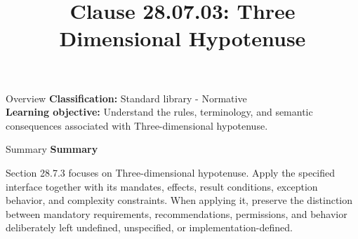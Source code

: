 \documentclass[10pt,letterpaper]{article}
\title{Clause 28.07.03: Three Dimensional Hypotenuse}
\author{}
\date{}
\begin{document}
\maketitle
\begin{CornellOverviewBox}{Overview}
\textbf{Classification:} Standard library - Normative\\[2pt]
\textbf{Learning objective:} Understand the rules, terminology, and semantic consequences associated with Three-dimensional hypotenuse.
\end{CornellOverviewBox}\begin{CornellSummaryBox}{Summary}
{\sffamily\bfseries\color{Accent} Summary}\par\vspace{3pt}Section 28.7.3 focuses on Three-dimensional hypotenuse. Apply the specified interface together with its mandates, effects, result conditions, exception behavior, and complexity constraints. When applying it, preserve the distinction between mandatory requirements, recommendations, permissions, and behavior deliberately left undefined, unspecified, or implementation-defined.
\end{CornellSummaryBox}
\end{document}
